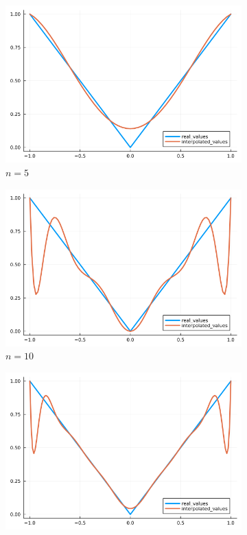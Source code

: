 \documentclass{article}
\def\v{0.47}
\begin{document}
	\begin{figure}[H]
	    \centering
		\begin{subfigure}[b]{\v\linewidth}
			\includegraphics[width=\linewidth]{graphs/zad6.a.5.png}
			\caption{$n = 5$}
		\end{subfigure}
		\begin{subfigure}[b]{\v\linewidth}
			\includegraphics[width=\linewidth]{graphs/zad6.a.10.png}
			\caption{$n = 10$}
		\end{subfigure}
		\begin{subfigure}[b]{\v\linewidth}
			\includegraphics[width=\linewidth]{graphs/zad6.a.15.png}

\end{subfigure}
\end{figure}
\end{document}
